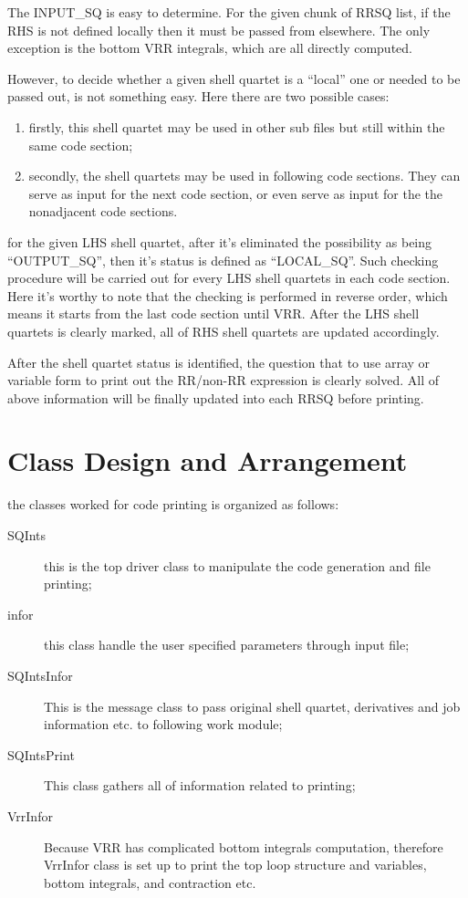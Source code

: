 The INPUT\_SQ is easy to determine. For the given chunk of RRSQ list, if the RHS is not defined
locally then it must be passed from elsewhere. The only exception is the bottom VRR integrals,
which are all directly computed.

However, to decide whether a given shell quartet is a ``local'' one or needed to be passed out,
is not something easy. Here there are two possible cases:
\begin{enumerate}
 \item firstly, this shell quartet may be used in other sub files but still within the same 
 code section;
 \item secondly, the shell quartets may be used in following code sections. They can serve
 as input for the next code section, or even serve as input for the the nonadjacent code 
 sections.
\end{enumerate}
for the given LHS shell quartet, after it's eliminated the possibility as being ``OUTPUT\_SQ'',
then it's status is defined as ``LOCAL\_SQ''. Such checking procedure will be carried out for every 
LHS shell quartets in each code section. Here it's worthy to note that the checking is 
performed in reverse order, which means it starts from the last code section until VRR.
After the LHS shell quartets is clearly marked, all of RHS shell quartets are updated
accordingly. 

After the shell quartet status is identified, the question that to use array or variable
form to print out the RR/non-RR expression is clearly solved. All of above information
will be finally updated into each RRSQ before printing.

\section{Class Design and Arrangement}

the classes worked for code printing is organized as follows:
\begin{description}
 \item [SQInts]  this is the top driver class to manipulate the code generation and 
 file printing;
 \item [infor]   this class handle the user specified parameters through input file;
 \item [SQIntsInfor]  This is the message class to pass original shell quartet, derivatives 
 and job information etc. to following work module;
 \item [SQIntsPrint]  This class gathers all of information related to printing;
 \item [VrrInfor] Because VRR has complicated bottom integrals computation, therefore VrrInfor
 class is set up to print the top loop structure and variables, bottom integrals, and contraction
 etc.
\end{description}

